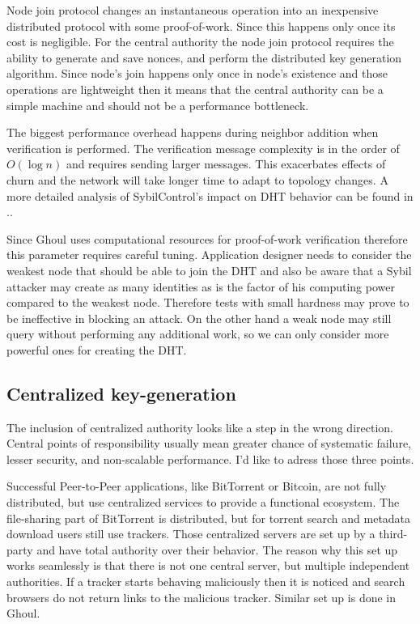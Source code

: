   Node join protocol changes an instantaneous operation into an inexpensive
  distributed protocol with some proof-of-work.
  Since this happens only once its cost is negligible.
  For the central authority the node join protocol requires the ability to
  generate and save nonces, and perform the distributed key generation
  algorithm.
  Since node's join happens only once in node's existence and those operations
  are lightweight then it means that the central authority can be a simple
  machine and should not be a performance bottleneck.

  The biggest performance overhead happens during neighbor addition when
  verification is performed. The verification message complexity is in the order
  of $O(\log n)$ and requires sending larger messages. This exacerbates effects
  of churn and the network will take longer time to adapt to topology changes.
  A more detailed analysis of SybilControl's impact on DHT behavior can be
  found in \cite{li12}..

  Since Ghoul uses computational resources for proof-of-work verification
  therefore this parameter requires careful tuning. Application designer needs
  to consider the weakest node that should be able to join the DHT and also be
  aware that a Sybil attacker may create as many identities as is the factor
  of his computing power compared to the weakest node. Therefore tests with
  small hardness may prove to be ineffective in blocking an attack. On the other
  hand a weak node may still query without performing any additional work,
  so we can only consider more powerful ones for creating the DHT.

  \subsection{Centralized key-generation}
  
  The inclusion of centralized authority looks like a step in the wrong
  direction. Central points of responsibility usually mean greater chance of
  systematic failure, lesser security, and non-scalable performance. I'd like to
  adress those three points.

  Successful Peer-to-Peer applications, like BitTorrent or Bitcoin, are not
  fully distributed, but use centralized services to provide a functional
  ecosystem. The file-sharing part of BitTorrent is distributed, but for 
  torrent search and metadata download users still use trackers. Those
  centralized servers are set up by a third-party and have total authority over
  their behavior. The reason why this set up works seamlessly is that
  there is not one central server, but multiple independent authorities. If a
  tracker starts behaving maliciously then it is noticed and search browsers do
  not return links to the malicious tracker. Similar set up is done in Ghoul.

